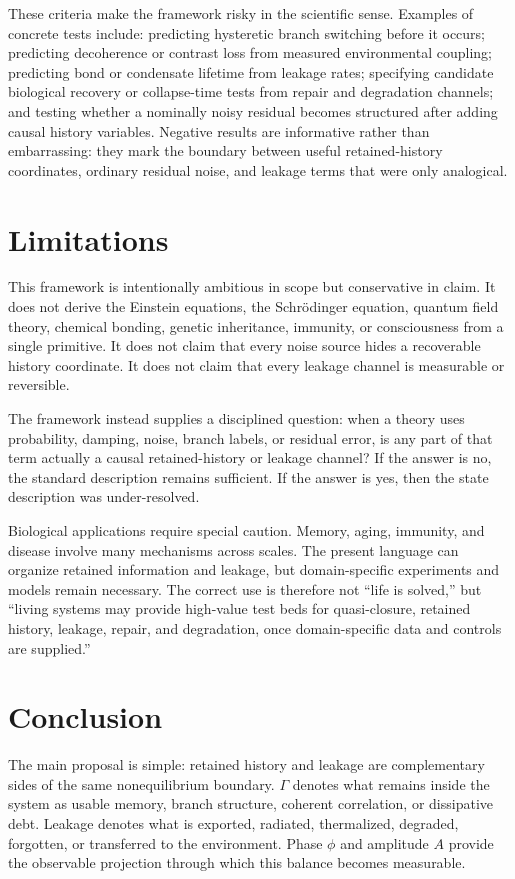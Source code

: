 \documentclass[11pt,a4paper]{article}
\newcommand{\Ghist}{\Gamma}
\begin{document}
These criteria make the framework risky in the scientific sense.  Examples of concrete tests include: predicting hysteretic branch switching before it occurs; predicting decoherence or contrast loss from measured environmental coupling; predicting bond or condensate lifetime from leakage rates; specifying candidate biological recovery or collapse-time tests from repair and degradation channels; and testing whether a nominally noisy residual becomes structured after adding causal history variables.  Negative results are informative rather than embarrassing: they mark the boundary between useful retained-history coordinates, ordinary residual noise, and leakage terms that were only analogical.

\section{Limitations}
This framework is intentionally ambitious in scope but conservative in claim.  It does not derive the Einstein equations, the Schr\"odinger equation, quantum field theory, chemical bonding, genetic inheritance, immunity, or consciousness from a single primitive.  It does not claim that every noise source hides a recoverable history coordinate.  It does not claim that every leakage channel is measurable or reversible.

The framework instead supplies a disciplined question: when a theory uses probability, damping, noise, branch labels, or residual error, is any part of that term actually a causal retained-history or leakage channel?  If the answer is no, the standard description remains sufficient.  If the answer is yes, then the state description was under-resolved.

Biological applications require special caution.  Memory, aging, immunity, and disease involve many mechanisms across scales.  The present language can organize retained information and leakage, but domain-specific experiments and models remain necessary.  The correct use is therefore not ``life is solved,'' but ``living systems may provide high-value test beds for quasi-closure, retained history, leakage, repair, and degradation, once domain-specific data and controls are supplied.''

\section{Conclusion}
The main proposal is simple: retained history and leakage are complementary sides of the same nonequilibrium boundary.  \(\Ghist\) denotes what remains inside the system as usable memory, branch structure, coherent correlation, or dissipative debt.  Leakage denotes what is exported, radiated, thermalized, degraded, forgotten, or transferred to the environment.  Phase \(\phi\) and amplitude \(A\) provide the observable projection through which this balance becomes measurable.
\end{document}

